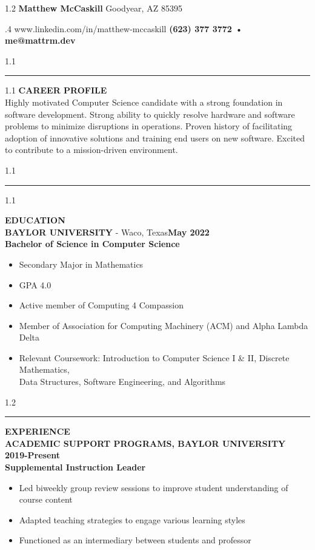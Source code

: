 \documentclass[11pt]{article}
\newcommand*{\resumeheader}[5]{
    \begin{spacing}{1.2}
        \textbf{\huge #1} \hfill #2
    \end{spacing}

    \begin{spacing}{.4}
        #4 \hfill \textbf{#3 • #5}
    \end{spacing}
}
\newcommand{\resumetextcategory}[2]{
    \begin{spacing}{1.1}
        \textbf{\Large \uppercase{#1}}\\
        #2
    \end{spacing}
}
\newcommand*{\resumeseparator}{
    \begin{spacing}{1.1}
        \noindent\rule{\textwidth}{1pt}
    \end{spacing}
}
\begin{document}
	\thispagestyle{empty}
    
    \resumeheader{Matthew McCaskill}{Goodyear, AZ 85395}{(623) 377 3772}{www.linkedin.com/in/matthew-mccaskill}{me@mattrm.dev}
    
    \resumeseparator
    
    \resumetextcategory{Career Profile}{Highly motivated Computer Science candidate with a strong foundation in software development. Strong ability to quickly resolve hardware and software problems to minimize disruptions in operations. Proven history of facilitating adoption of innovative solutions and training end users on new software. Excited to contribute to a mission-driven environment.}

	\resumeseparator
    
	\begin{spacing}{1.1}
		
		\textbf{\Large EDUCATION}\\
		\textbf{\uppercase {Baylor University}} - Waco, Texas\hfill \textbf{May 2022}\\
		\textbf{Bachelor of Science in Computer Science}
		
		\begin{itemize}[topsep=1pt,itemsep=1pt,partopsep=.5pt, parsep=.5pt]
            \item Secondary Major in Mathematics
			\item GPA 4.0
			\item Active member of Computing 4 Compassion
            \item Member of Association for Computing Machinery (ACM) and Alpha Lambda Delta
            \item Relevant Coursework: Introduction to Computer Science I \& II, Discrete Mathematics,\\ Data Structures, Software Engineering, and Algorithms%
		\end{itemize}
		
		\begin{spacing}{1.2}
			\noindent\rule{\textwidth}{1pt}
		\end{spacing}
		\textbf{\Large EXPERIENCE}\\
		\textbf{\uppercase {Academic Support Programs, Baylor University}} \hfill \textbf{2019-Present}\\
		\textbf{Supplemental Instruction Leader}
		\begin{itemize}[topsep=1pt,itemsep=1pt,partopsep=.5pt, parsep=.5pt]
			\item Led biweekly group review sessions to improve student understanding of course content
            \item Adapted teaching strategies to engage various learning styles
            \item Functioned as an intermediary between students and professor
		\end{itemize}
    

\end{spacing}
\end{document}
